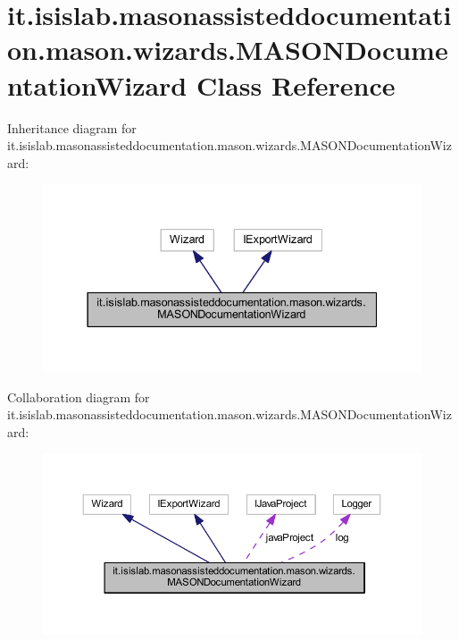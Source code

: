 \hypertarget{classit_1_1isislab_1_1masonassisteddocumentation_1_1mason_1_1wizards_1_1_m_a_s_o_n_documentation_wizard}{\section{it.\-isislab.\-masonassisteddocumentation.\-mason.\-wizards.\-M\-A\-S\-O\-N\-Documentation\-Wizard Class Reference}
\label{classit_1_1isislab_1_1masonassisteddocumentation_1_1mason_1_1wizards_1_1_m_a_s_o_n_documentation_wizard}
}


Inheritance diagram for it.\-isislab.\-masonassisteddocumentation.\-mason.\-wizards.\-M\-A\-S\-O\-N\-Documentation\-Wizard\-:
\nopagebreak
\begin{figure}[H]
\begin{center}
\leavevmode
\includegraphics[width=337pt]{classit_1_1isislab_1_1masonassisteddocumentation_1_1mason_1_1wizards_1_1_m_a_s_o_n_documentation_wizard__inherit__graph}
\end{center}
\end{figure}


Collaboration diagram for it.\-isislab.\-masonassisteddocumentation.\-mason.\-wizards.\-M\-A\-S\-O\-N\-Documentation\-Wizard\-:
\nopagebreak
\begin{figure}[H]
\begin{center}
\leavevmode
\includegraphics[width=350pt]{classit_1_1isislab_1_1masonassisteddocumentation_1_1mason_1_1wizards_1_1_m_a_s_o_n_documentation_wizard__coll__graph}
\end{center}
\end{figure}
